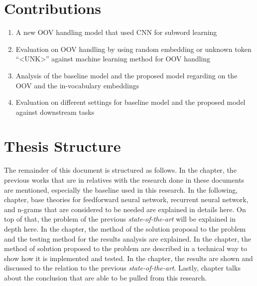 \section{Contributions}
    \begin{enumerate}
        \item A new OOV handling model that used CNN for subword learning
        \item Evaluation on OOV handling by using random embedding or 
        unknown token ``\textless UNK\textgreater'' against machine learning
        method for OOV handling
        \item Analysis of the baseline model and the proposed model
        regarding on the OOV and the in-vocabulary embeddings
        \item Evaluation on different settings for baseline model and
        the proposed model against downstream tasks
    \end{enumerate}

\section{Thesis Structure}
    The remainder of this document is structured as follows. In the
     chapter, the previous works that are in
    relatives with the research done in these documents are mentioned,
    especially the baseline used in this research. In the following,
     chapter, base theories for
    feedforward neural network, recurrent neural network, and n-grams
    that are considered to be needed are explained in details here. On
    top of that, the problem of the previous \textit{state-of-the-art}
    will be explained in depth here. In the 
    chapter, the method of the solution proposal to the problem and
    the testing method for the results analysis are explained. In the
     chapter, the method of solution
    proposed to the problem are described in a technical way to show how
    it is implemented and tested. In the 
    chapter, the results are shown and discussed to the relation to
    the previous \textit{state-of-the-art}. Lastly,
     chapter talks about the conclusion that are
    able to be pulled from this research.